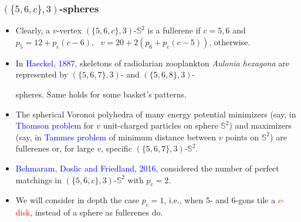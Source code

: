\documentclass{beamer}
\begin{document}
\begin{frame}\frametitle{ $(\{5,6,c\},3)$-spheres}

\begin{itemize}

\item Clearly,  a $v$-vertex $(\{5,6,c\},3)$-$\mathbb{S}^2$ is a fullerene if $c=5,6$ and 
$p_5=12+p_c(c-6)$, $\,\,\,v=20+2(p_6+ p_c(c-5))$, otherwise.

 

\item In \textcolor{blue}{Haeckel, 1887},
 skeletons of radiolarian zooplankton {\em Aulonia hexagona} are represented by $(\{5, 6, 7\}, 3)$- and $(\{5,6, 8\}, 3)$-
 
 spheres.
  Same holds for some basket's patterns.
  
  
  \item  The spherical Voronoi polyhedra of many
 energy potential minimizers
 (say, in \textcolor{blue}{Thomson problem} for
$v$ unit-charged particles on sphere $\mathbb{S}^2$) and 
  maximizers 
  (say, in \textcolor{blue}{Tammes problem}
of minimum distance between $v$ points on $\mathbb{S}^2$)  are  fullerenes or, for large $v$,  specific $(\{5,6,7\},3)$-$\mathbb{S}^2$.  
  
  \item \textcolor{blue}{Behmaram, Doslic and Friedland, 2016}, considered the number of perfect matchings in $(\{5,6,c\},3)$-$\mathbb{S}^2$ with $p_c=2$.
\item We will consider in depth the case $p_c=1$, i.e., when   $5$- and $6$-gons tile a \textcolor{red}{$c$-disk}, instead of a sphere as fullerenes do.
\end{itemize}
\end{frame}
\end{document}
